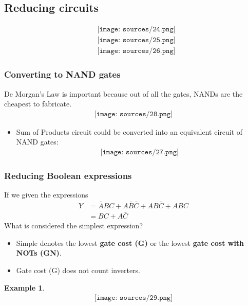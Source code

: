 \documentclass[12pt]{article}
\theoremstyle{definition}
\newtheorem{example}{Example}[section]
\begin{document}
\subsection{Reducing circuits}
\begin{align*}
    &\texttt{[image: sources/24.png]}\\
    &\texttt{[image: sources/25.png]}\\
    &\texttt{[image: sources/26.png]}
\end{align*}
\subsubsection{Converting to NAND gates}
De Morgan's Law is important because out of all the gates, NANDs are the cheapest to fabricate.
\begin{align*}
    \texttt{[image: sources/28.png]}
\end{align*}
\begin{itemize}
    \item Sum of Products circuit could be converted into an equivalent circuit of NAND gates:\begin{align*}
        \texttt{[image: sources/27.png]}\end{align*}
\end{itemize}
\subsubsection{Reducing Boolean expressions}
If we given the expressions
\begin{align*}
    Y&=\bar{A}BC+A\bar{B}\bar{C}+AB\bar{C}+ABC\\
    &=BC+A\bar{C} \tag{by combining end and middle terms.}
\end{align*}
What is considered the simplest expression?
\begin{itemize}
    \item Simple denotes the lowest \textbf{gate cost (G)} or the lowest \textbf{gate cost with NOTs (GN)}.
    \item Gate cost (G) does not count inverters.
\end{itemize}
\begin{example}
    \begin{align*}
        \texttt{[image: sources/29.png]}
    \end{align*}
\end{example}
\end{document}
